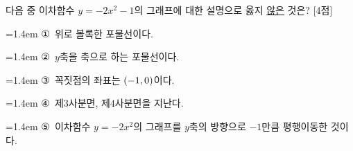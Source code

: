 다음 중 이차함수 $y=-2x^2-1$의 그래프에 대한 설명으로 옳지 \underline{않은} 것은? \mbox{[4점]}
\par\medskip\par\noindent\hangindent=1.4em {\small ①}\ 위로 볼록한 포물선이다.\par\noindent\hangindent=1.4em {\small ②}\ $y$축을 축으로 하는 포물선이다.\par\noindent\hangindent=1.4em {\small ③}\ 꼭짓점의 좌표는 $(-1{,}\mkern3mu 0)$이다.\par\noindent\hangindent=1.4em {\small ④}\ 제$3$사분면, 제$4$사분면을 지난다.\par\noindent\hangindent=1.4em {\small ⑤}\ 이차함수 $y=-2x^2$의 그래프를 $y$축의 방향으로 $-1$만큼 평행이동한 것이다.\par\medskip
